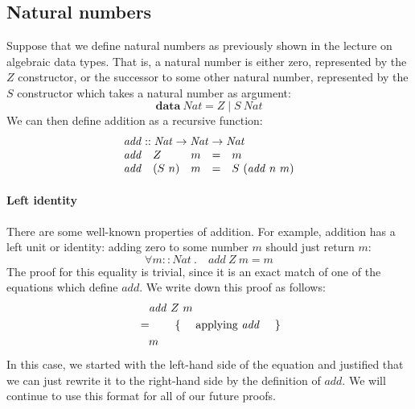 \section{\lectureTenTitle}
\label{sec:lecture-10}

\subsection{Natural numbers}

Suppose that we define natural numbers as previously shown in the lecture on algebraic data types. That is, a natural number is either zero, represented by the $Z$ constructor, or the successor to some other natural number, represented by the $S$ constructor which takes a natural number as argument:
\begin{displaymath}
\mathbf{data}~\mathit{Nat} = Z \mid S~\mathit{Nat}
\end{displaymath}
We can then define addition as a recursive function:
\begin{displaymath}
\begin{array}{lllcl}
\multicolumn{5}{l}{\mathit{add} :: \mathit{Nat} \to \mathit{Nat} \to \mathit{Nat}} \\
\mathit{add} & Z & m & = & m \\
\mathit{add} & (S~n) & m & = & S~(\mathit{add}~n~m)
\end{array}
\end{displaymath}

\paragraph{Left identity}

There are some well-known properties of addition. For example, addition has a left unit or identity: adding zero to some number $m$ should just return $m$:
\begin{displaymath}
\forall m :: \mathit{Nat} ~.\quad \mathit{add}~Z~m = m
\end{displaymath}
The proof for this equality is trivial, since it is an exact match of one of the equations which define $\mathit{add}$. We write down this proof as follows:
\begin{align*}
&\quad \mathit{add}~Z~m\\
&=\qquad\text{\{\quad\ applying $\mathit{add}$ \quad\}}\\
&\quad m
\end{align*}
In this case, we started with the left-hand side of the equation and justified that we can just rewrite it to the right-hand side by the definition of $\mathit{add}$. We will continue to use this format for all of our future proofs.

